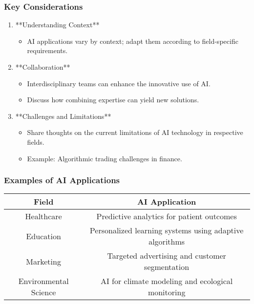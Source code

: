 \documentclass[aspectratio=169]{beamer}
\begin{document}
\begin{frame}[fragile]
    \frametitle{Key Considerations}
    \begin{enumerate}
        \item **Understanding Context**
            \begin{itemize}
                \item AI applications vary by context; adapt them according to field-specific requirements.
            \end{itemize}
        
        \item **Collaboration**
            \begin{itemize}
                \item Interdisciplinary teams can enhance the innovative use of AI.
                \item Discuss how combining expertise can yield new solutions.
            \end{itemize}

        \item **Challenges and Limitations**
            \begin{itemize}
                \item Share thoughts on the current limitations of AI technology in respective fields.
                \item Example: Algorithmic trading challenges in finance.
            \end{itemize}
    \end{enumerate}
\end{frame}

\begin{frame}[fragile]
    \frametitle{Examples of AI Applications}
    \begin{table}[ht]
        \centering
        \begin{tabular}{|c|c|}
            \hline
            \textbf{Field} & \textbf{AI Application} \\
            \hline
            Healthcare & Predictive analytics for patient outcomes \\
            Education & Personalized learning systems using adaptive algorithms \\
            Marketing & Targeted advertising and customer segmentation \\
            Environmental Science & AI for climate modeling and ecological monitoring \\
            \hline
        \end{tabular}
    \end{table}
\end{frame}
\end{document}
